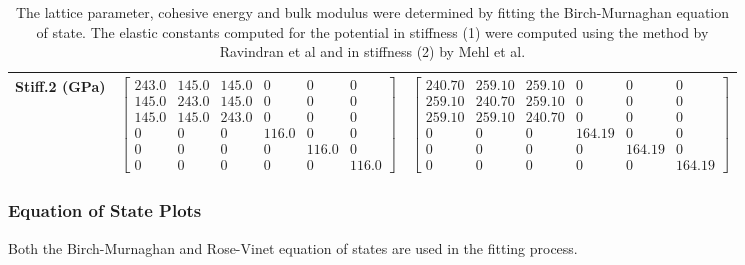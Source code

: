 \begin{table}[ht]
\begin{tabular}{lcccccc}
Stiff.2 (GPa) & \multicolumn{3}{c}{$\begin{bmatrix} 243.0 & 145.0 & 145.0 & 0 & 0 & 0 \\ 145.0 & 243.0 & 145.0 & 0 & 0 & 0 \\ 145.0 & 145.0 & 243.0 & 0 & 0 & 0 \\ 0 & 0 & 0 & 116.0 & 0 & 0 \\ 0 & 0 & 0 & 0 & 116.0 & 0 \\ 0 & 0 & 0 & 0 & 0 & 116.0 \end{bmatrix}$}   & \multicolumn{3}{c}{$\begin{bmatrix} 240.70 & 259.10 & 259.10 & 0 & 0 & 0 \\ 259.10 & 240.70 & 259.10 & 0 & 0 & 0 \\ 259.10 & 259.10 & 240.70 & 0 & 0 & 0 \\ 0 & 0 & 0 & 164.19 & 0 & 0 \\ 0 & 0 & 0 & 0 & 164.19 & 0 \\ 0 & 0 & 0 & 0 & 0 & 164.19 \end{bmatrix}$} \\
\hline\hline
\end{tabular}
\caption{The lattice parameter, cohesive energy and bulk modulus were determined by fitting the Birch-Murnaghan equation of state.  The elastic constants computed for the potential in stiffness (1) were computed using the method by Ravindran et al\cite{dfttisiravindran} and in stiffness (2) by Mehl et al\cite{mehlsp}\cite{elasticpropertiesmehl}.}
\label{table:fepd-pdfcc-dftvspotential}
\end{table}



\subsubsection{Equation of State Plots}

Both the Birch-Murnaghan and Rose-Vinet equation of states are used in the fitting process.

